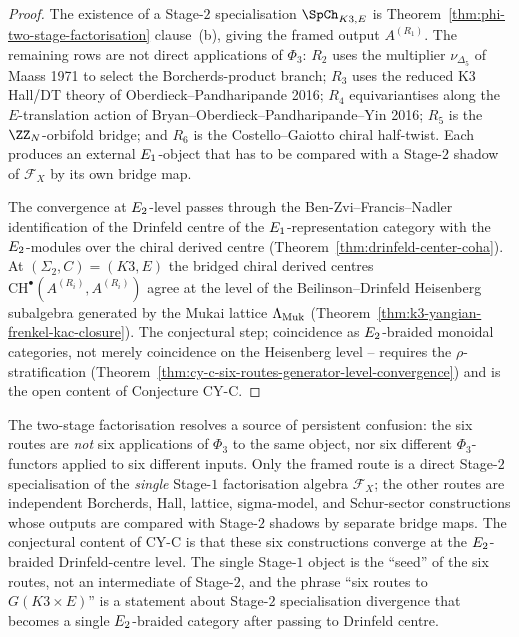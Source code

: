 \begin{proof}
The existence of a Stage-$2$ specialisation
$\SpCh_{K3,E}$ is Theorem~\ref{thm:phi-two-stage-factorisation}
clause~(b), giving the framed output $A^{(R_1)}$. The remaining rows
are not direct applications of $\Phi_3$: $R_2$ uses the multiplier
$\nu_{\Delta_5}$ of Maass 1971 to select the Borcherds-product branch;
$R_3$ uses the reduced K3 Hall/DT theory of
Oberdieck--Pandharipande 2016; $R_4$ equivariantises along the
$E$-translation action of Bryan--Oberdieck--Pandharipande--Yin 2016;
$R_5$ is the $\ZZ_N$-orbifold bridge; and $R_6$ is the
Costello--Gaiotto chiral half-twist. Each produces an external
$E_{1}$-object that has to be compared with a Stage-$2$ shadow of
$\mathcal F_X$ by its own bridge map.

The convergence at $E_{2}$-level passes through the Ben-Zvi--Francis--Nadler
identification of the Drinfeld centre of the $E_{1}$-representation
category with the $E_{2}$-modules over the chiral derived centre
(Theorem~\ref{thm:drinfeld-center-coha}). At
$(\Sigma_2, C) = (K3, E)$ the bridged chiral derived centres
$\mathrm{CH}^\bullet(A^{(R_i)}, A^{(R_i)})$ agree at the level of the
Beilinson--Drinfeld Heisenberg subalgebra generated by the
Mukai lattice $\Lambda_{\mathrm{Muk}}$ (Theorem~\ref{thm:k3-yangian-frenkel-kac-closure}).
The conjectural step; coincidence as $E_{2}$-braided monoidal
categories, not merely coincidence on the Heisenberg level --
requires the $\rho$-stratification
(Theorem~\ref{thm:cy-c-six-routes-generator-level-convergence}) and is
the open content of Conjecture CY-C.
\end{proof}

\begin{remark}
\label{rem:cy-c-beyond-single-stage-1-six-shadows}
The two-stage factorisation resolves a source of persistent
confusion: the six routes are \emph{not} six applications of $\Phi_3$
to the same object, nor six different $\Phi_3$-functors applied to
six different inputs. Only the framed route is a direct Stage-$2$
specialisation of the \emph{single} Stage-$1$ factorisation algebra
$\mathcal F_X$; the other routes are independent Borcherds, Hall,
lattice, sigma-model, and Schur-sector constructions whose outputs are
compared with Stage-$2$ shadows by separate bridge maps. The conjectural
content of CY-C is that these six constructions converge at the
$E_{2}$-braided Drinfeld-centre level.
The single Stage-$1$ object is the ``seed'' of the six routes, not
an intermediate of Stage-$2$, and the phrase ``six routes to
$G(K3 \times E)$'' is a statement about Stage-$2$ specialisation
divergence that becomes a single $E_{2}$-braided category after
passing to Drinfeld centre.
\end{remark}

